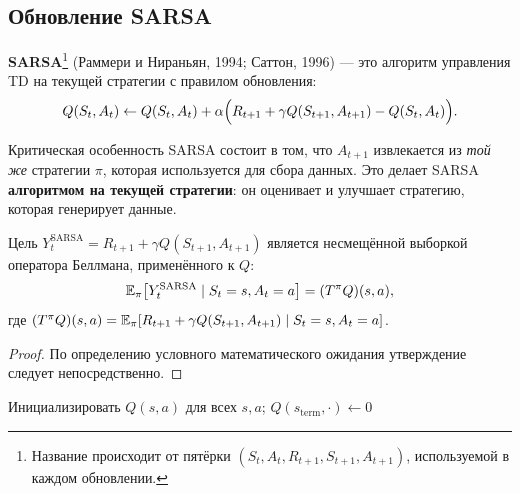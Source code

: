 \subsection{Обновление SARSA}

\begin{definition}[SARSA]
\label{def:sarsa}
\textbf{SARSA}\footnote{Название происходит от пятёрки $(S_t, A_t, R_{t+1}, S_{t+1}, A_{t+1})$, используемой в каждом обновлении.} (Раммери и Нираньян, 1994; Саттон, 1996) --- это алгоритм управления TD на текущей стратегии с правилом обновления:
\begin{equation}
\label{eq:sarsa}
Q(S_t,A_t) \leftarrow Q(S_t,A_t) + \alpha\Bigl(R_{t+1} + \gamma Q(S_{t+1},A_{t+1}) - Q(S_t,A_t)\Bigr).
\end{equation}
\end{definition}

Критическая особенность SARSA состоит в том, что $A_{t+1}$ извлекается из \emph{той же} стратегии $\pi$, которая используется для сбора данных.  Это делает SARSA \textbf{алгоритмом на текущей стратегии}: он оценивает и улучшает стратегию, которая генерирует данные.

\begin{proposition}
Цель $Y_t^{\mathrm{SARSA}} = R_{t+1} + \gamma Q(S_{t+1},A_{t+1})$ является несмещённой выборкой оператора Беллмана, применённого к $Q$:
\[
\operatorname{\mathbb{E}}_\pi\bigl[Y_t^{\mathrm{SARSA}} \mid S_t=s, A_t=a\bigr] = (T^\pi Q)(s,a),
\]
где $(T^\pi Q)(s,a) = \operatorname{\mathbb{E}}_\pi[R_{t+1}+\gamma Q(S_{t+1},A_{t+1}) \mid S_t=s, A_t=a]$.
\end{proposition}

\begin{proof}
По определению условного математического ожидания утверждение следует непосредственно.
\end{proof}

\begin{algorithm}[ht]
\caption{SARSA (управление TD на текущей стратегии)}
\label{alg:sarsa}
Инициализировать $Q(s,a)$ для всех $s,a$; $Q(s_{\mathrm{term}},\cdot)\leftarrow 0$\;
\end{algorithm}

